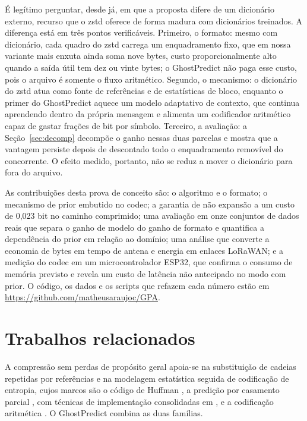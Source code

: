 \documentclass[12pt]{article}
\begin{document}
É legítimo perguntar, desde já, em que a proposta difere de um dicionário
externo, recurso que o zstd oferece de forma madura com dicionários treinados. A
diferença está em três pontos verificáveis. Primeiro, o formato: mesmo com
dicionário, cada quadro do zstd carrega um enquadramento fixo, que em nossa
variante mais enxuta ainda soma nove bytes, custo proporcionalmente alto quando
a saída útil tem dez ou vinte bytes; o GhostPredict não paga esse custo, pois o
arquivo é somente o fluxo aritmético. Segundo, o mecanismo: o dicionário do zstd
atua como fonte de referências e de estatísticas de bloco, enquanto o primer do
GhostPredict aquece um modelo adaptativo de contexto, que continua aprendendo
dentro da própria mensagem e alimenta um codificador aritmético capaz de gastar
frações de bit por símbolo. Terceiro, a avaliação: a Seção~\ref{sec:decomp}
decompõe o ganho nessas duas parcelas e mostra que a vantagem persiste depois de
descontado todo o enquadramento removível do concorrente. O efeito medido,
portanto, não se reduz a mover o dicionário para fora do arquivo.

As contribuições desta prova de conceito são: o algoritmo e o formato; o mecanismo de prior embutido no
codec; a garantia de não expansão a um custo de 0,023 bit no caminho
comprimido; uma avaliação em onze conjuntos de dados reais que separa o ganho de
modelo do ganho de formato e quantifica a dependência do prior em relação ao
domínio; uma análise que converte a economia de bytes em tempo de antena e
energia em enlaces LoRaWAN; e a medição do codec em um microcontrolador ESP32,
que confirma o consumo de memória previsto e revela um custo de latência não
antecipado no modo com prior. O código, os dados e os scripts que refazem cada
número estão em \url{https://github.com/matheusaraujoc/GPA}.

\section{Trabalhos relacionados}

A compressão sem perdas de propósito geral apoia-se na substituição de cadeias
repetidas por referências \cite{ziv:77} e na modelagem estatística seguida de
codificação de entropia, cujos marcos são o código de Huffman \cite{huffman:52},
a predição por casamento parcial \cite{cleary:84}, com técnicas de
implementação consolidadas em \cite{moffat:90}, e a codificação
aritmética \cite{witten:87}. O GhostPredict combina as duas famílias.
\end{document}
